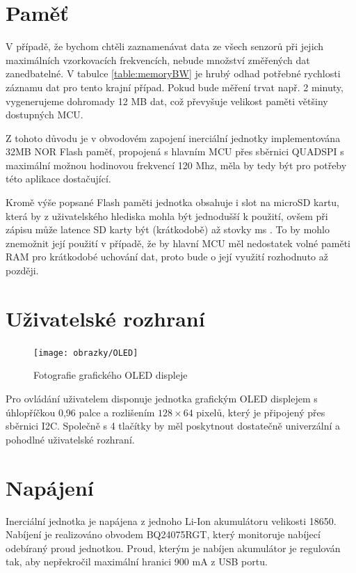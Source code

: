 \section{Paměť}

V případě, že bychom chtěli zaznamenávat data ze všech senzorů při jejich maximálních vzorkovacích frekvencích, nebude množství změřených dat zanedbatelné. V tabulce \ref{table:memoryBW} je hrubý odhad potřebné rychlosti záznamu dat pro tento krajní případ. Pokud bude měření trvat např. 2 minuty, vygenerujeme dohromady 12 MB dat, což převyšuje velikost paměti většiny dostupných \ac{MCU}.

Z tohoto důvodu je v obvodovém zapojení inerciální jednotky implementována 32MB NOR Flash paměť, propojená s hlavním \ac{MCU} přes sběrnici QUADSPI s maximální možnou hodinovou frekvencí 120 Mhz, měla by tedy být pro potřeby této aplikace dostačující. \cite{CgaRYSTpwKhEZZr7}

Kromě výše popsané Flash paměti jednotka obsahuje i slot na microSD kartu, která by z uživatelského hlediska mohla být jednodušší k použití, ovšem při zápisu může latence SD karty být (krátkodobě) až stovky ms \cite{Kraewinkel2020}. To by mohlo znemožnit její použití v případě, že by hlavní \ac{MCU} měl nedostatek volné paměti RAM pro krátkodobé uchování dat, proto bude o její využití rozhodnuto až později.

\section{Uživatelské rozhraní}
\begin{figure}[h]
    \centering
    \texttt{[image: obrazky/OLED]}
    \caption{Fotografie grafického OLED displeje}
\end{figure}
Pro ovládání uživatelem disponuje jednotka grafickým \ac{OLED} displejem s úhlopříčkou 0,96 palce a rozlišením $ 128 \times 64 $ pixelů, který je připojený přes sběrnici \ac{I2C}. Společně s 4 tlačítky by měl poskytnout dostatečně univerzální a pohodlné uživatelské rozhraní.

\section{Napájení}
Inerciální jednotka je napájena z jednoho Li-Ion akumulátoru velikosti 18650. Nabíjení je realizováno obvodem BQ24075RGT, který monitoruje nabíjecí odebíraný proud jednotkou. Proud, kterým je nabíjen akumulátor je regulován tak, aby nepřekročil maximální hranici 900 mA z USB portu. \cite{F5eZCtr2LLRsr9NT}

